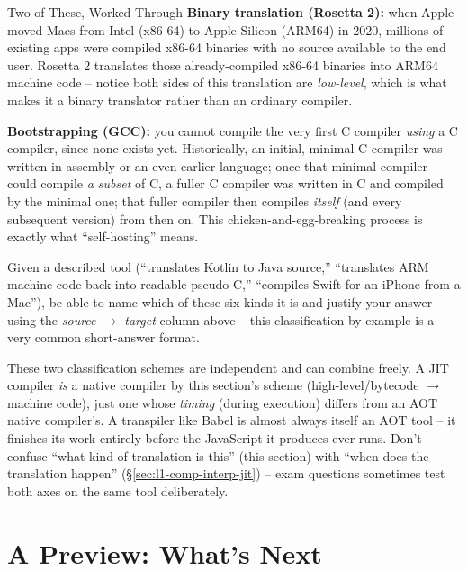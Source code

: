 \documentclass[full-course-notes.tex]{subfiles}
\begin{document}
\begin{examplebox}{Two of These, Worked Through}
\textbf{Binary translation (Rosetta 2):} when Apple moved Macs from Intel (x86-64) to Apple
Silicon (ARM64) in 2020, millions of existing apps were compiled x86-64 binaries with no source
available to the end user. Rosetta 2 translates those already-compiled x86-64 binaries into
ARM64 machine code -- notice both sides of this translation are \emph{low-level}, which is what
makes it a binary translator rather than an ordinary compiler.

\textbf{Bootstrapping (GCC):} you cannot compile the very first C compiler \emph{using} a C
compiler, since none exists yet. Historically, an initial, minimal C compiler was written in
assembly or an even earlier language; once that minimal compiler could compile \emph{a subset}
of C, a fuller C compiler was written in C and compiled by the minimal one; that fuller compiler
then compiles \emph{itself} (and every subsequent version) from then on. This
chicken-and-egg-breaking process is exactly what ``self-hosting'' means.
\end{examplebox}

\begin{examfocus}
Given a described tool (``translates Kotlin to Java source,'' ``translates ARM machine code
back into readable pseudo-C,'' ``compiles Swift for an iPhone from a Mac''), be able to name
which of these six kinds it is and justify your answer using the \emph{source $\to$ target}
column above -- this classification-by-example is a very common short-answer format.
\end{examfocus}

\begin{enrichment}
These two classification schemes are independent and can combine freely. A JIT compiler
\emph{is} a native compiler by this section's scheme (high-level/bytecode $\to$ machine code),
just one whose \emph{timing} (during execution) differs from an AOT native compiler's. A
transpiler like Babel is almost always itself an AOT tool -- it finishes its work entirely
before the JavaScript it produces ever runs. Don't confuse ``what kind of translation is this''
(this section) with ``when does the translation happen'' (\S\ref{sec:l1-comp-interp-jit}) --
exam questions sometimes test both axes on the same tool deliberately.
\end{enrichment}

\section{A Preview: What's Next}
\label{sec:l1-preview}
\end{document}
